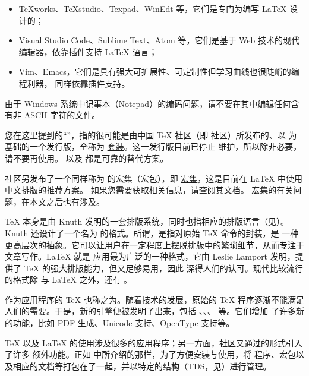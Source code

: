 \begin{itemize}
  \item TeXworks、TeXstudio、Texpad、WinEdt 等，它们是专门为编写 \LaTeX{} 设计的；
  \item Visual Studio Code、Sublime Text、Atom 等，它们是基于 Web 技术的现代编辑器，依靠插件支持
    \LaTeX{} 语言；
  \item Vim、Emacs，它们是具有强大可扩展性、可定制性但学习曲线也很陡峭的编程利器，
    同样依靠插件支持。
\end{itemize}

\begin{note}
  由于 Windows 系统中记事本（Notepad）的编码问题，请不要在其中编辑任何含有非 ASCII 字符的文件。
\end{note}



您在这里提到的“\CTeX{}”，指的很可能是由中国 \TeX{} 社区（即 \CTeX{} 社区）所发布的、以 \MiKTeX{}
为基础的一个发行版，全称为 \href{http://www.ctex.org/CTeX}{\CTeX{} 套装}。这一发行版目前已停止
维护，所以除非必要，请不要再使用。\TeXLive{} 以及 \MiKTeX{} 都是可靠的替代方案。

\CTeX{} 社区另发布了一个同样称为 \CTeX{} 的宏集（宏包），即
\href{https://www.ctan.org/pkg/ctex}{\CTeX{} 宏集}，这是目前在 \LaTeX{} 中使用中文排版的推荐方案。
如果您需要获取相关信息，请查阅其文档。\CTeX{} 宏集的有关问题，在本文之后也有涉及。



\TeX{} 本身是由 Knuth 发明的一套排版系统，同时也指相应的排版语言（见）。
Knuth 还设计了一个名为 \PlainTeX{} 的格式。所谓，是指对原始 \TeX{} 命令的封装，是
一种更高层次的抽象。它可以让用户在一定程度上摆脱排版中的繁琐细节，从而专注于文章写作。\LaTeX{} 就是
应用最为广泛的一种格式，它由 Leslie Lamport 发明，提供了 \TeX{} 的强大排版能力，但又足够易用，因此
深得人们的认可。现代比较流行的格式除 \PlainTeX{} 与 \LaTeX{} 之外，还有 \ConTeXt{}。

作为应用程序的 \TeX{} 也称之为。随着技术的发展，原始的 \TeX{} 程序逐渐不能满足
人们的需要。于是，新的引擎便被发明了出来，包括 \eTeX{}、\pdfTeX{}、\XeTeX{}、\LuaTeX{} 等。它们增加
了许多新的功能，比如 PDF 生成、Unicode 支持、OpenType 支持等。

\TeX{} 以及 \LaTeX{} 的使用涉及很多的应用程序；另一方面，社区又通过的形式引入了许多
额外功能。正如 中所介绍的那样，为了方便安装与使用，将
程序、宏包以及相应的文档等打包在了一起，并以特定的结构（TDS，见）进行管理。

